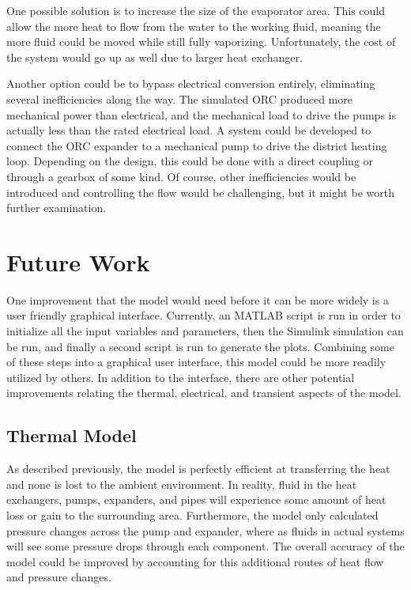 One possible solution is to increase the size of the evaporator area. This could allow the more heat to flow from the water to the working fluid, meaning the more fluid could be moved while still fully vaporizing. Unfortunately, the cost of the system would go up as well due to larger heat exchanger.

Another option could be to bypass electrical conversion entirely, eliminating several inefficiencies along the way. The simulated ORC produced more mechanical power than electrical, and the mechanical load to drive the pumps is actually less than the rated electrical load.
A system could be developed to connect the ORC expander to a mechanical pump to drive the district heating loop. Depending on the design, this could be done with a direct coupling or through a gearbox of some kind. Of course, other inefficiencies would be introduced and controlling the flow would be challenging, but it might be worth further examination.

\section{Future Work}
One improvement that the model would need before it can be more widely is a user friendly graphical interface. Currently, an MATLAB script is run in order to initialize all the input variables and parameters, then the Simulink simulation can be run, and finally a second script is run to generate the plots. Combining some of these steps into a graphical user interface, this model could be more readily utilized by others. In addition to the interface, there are other potential improvements relating the thermal, electrical, and transient aspects of the model.

\subsection{Thermal Model}
As described previously, 
the model is perfectly efficient at transferring the heat and none is lost to the ambient environment. In reality, fluid in the heat exchangers, pumps, expanders, and pipes will experience some amount of heat loss or gain to the surrounding area. Furthermore, the model only calculated pressure changes across the pump and expander, where as fluids in actual systems will see some pressure drops through each component. The overall accuracy of the model could be improved by accounting for this additional routes of heat flow and pressure changes.

